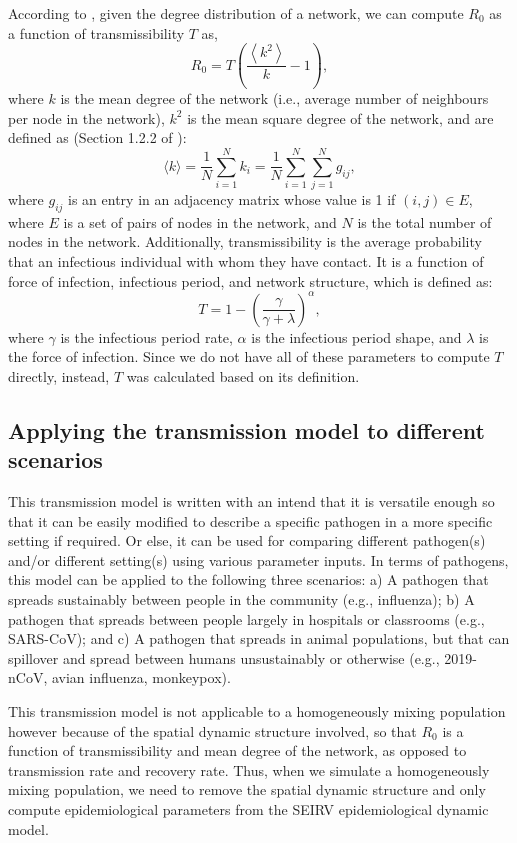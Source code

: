 \documentclass[a4paper]{article}
\begin{document}
	According to \cite{Meyers2005JTheoBiol}, given the degree distribution of a network, we can compute $R_0$ as a function of transmissibility $T$ as,
	\begin{equation}
	R_0 = T\left (\frac{\left \langle k^2 \right \rangle}{k}-1\right),
	\end{equation}
	where $k$ is the mean degree of the network (i.e., average number of neighbours per node in the network), $k^2$ is the mean square degree of the network, and are defined as (Section 1.2.2 of \cite{Kiss2017}):
	\begin{equation}\label{equ: degree}
	\langle k\rangle = \frac{1}{N}\sum_{i=1}^{N}k_i=\frac{1}{N}\sum_{i=1}^{N}\sum_{j=1}^{N}g_{ij},
	\end{equation}
	where $g_{ij}$ is an entry in an adjacency matrix whose value is 1 if $(i,j) \in E$, where $E$ is a set of pairs of nodes in the network, and $N$ is the total number of nodes in the network. Additionally, transmissibility is the average probability that an infectious individual with whom they have contact. It is a function of force of infection, infectious period, and network structure, which is defined as\cite{Kahn2018ClinTrials}:
	\begin{equation}\label{equ: transmissibility}
	T = 1-\left(\frac{\gamma}{\gamma+\lambda}\right)^\alpha,
	\end{equation}
	where $\gamma$ is the infectious period rate, $\alpha$ is the infectious period shape, and $\lambda$ is the force of infection. Since we do not have all of these parameters to compute $T$ directly, instead, $T$ was calculated based on its definition.
	
	\subsection{Applying the transmission model to different scenarios}
	\label{sec:Example}
	This transmission model is written with an intend that it is versatile enough so that it can be easily modified to describe a specific pathogen in a more specific setting if required. Or else, it can be used for comparing different pathogen(s) and/or different setting(s) using various parameter inputs. In terms of pathogens, this model can be applied to the following three scenarios: a) A pathogen that spreads sustainably between people in the community (e.g., influenza); b) A pathogen that spreads between people largely in hospitals or classrooms (e.g., SARS-CoV); and c) A pathogen that spreads in animal populations, but that can spillover and spread between humans unsustainably or otherwise (e.g., 2019-nCoV, avian influenza, monkeypox). 
	
	This transmission model is not applicable to a homogeneously mixing population however because of the spatial dynamic structure involved, so that $R_0$ is a function of transmissibility and mean degree of the network, as opposed to transmission rate and recovery rate. Thus, when we simulate a homogeneously mixing population, we need to remove the spatial dynamic structure and only compute epidemiological parameters from the SEIRV epidemiological dynamic model.
	
	\label{Bibliography}
	
	
	
\end{document}
